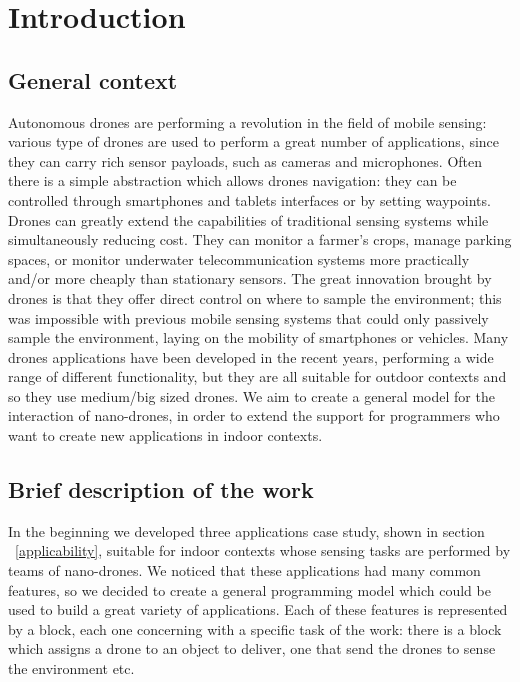 \chapter{Introduction}
\label{cap1}


\section{General context}

Autonomous drones are performing a revolution in the field of mobile sensing:
various type of drones are used to perform a great number of applications, since they can carry rich sensor payloads, such as cameras and microphones.
Often there is a simple abstraction which allows drones navigation: they can be controlled through smartphones and tablets interfaces or by setting waypoints.
Drones can greatly extend the capabilities of traditional sensing systems while simultaneously reducing cost.
They can monitor a farmer’s crops, manage parking spaces, or monitor underwater telecommunication systems more practically and/or more cheaply than stationary sensors.
The great innovation brought by drones is that they offer direct control on where to sample the environment; this was impossible with previous mobile sensing systems that could only passively sample the environment, laying on the mobility of smartphones or vehicles.
Many drones applications have been developed in the recent years, performing a wide range of different functionality, but they are all suitable for outdoor contexts and so they use medium/big sized drones.
We aim to create a general model for the interaction of nano-drones, in order to extend the support for programmers who want to create new applications in indoor contexts.


\section{Brief description of the work}

In the beginning we developed three applications case study, shown in section ~\ref{applicability}, suitable for indoor contexts whose sensing tasks are performed by teams of nano-drones.
We noticed that these applications had many common features, so we decided to create a general programming model which could be used to build a great variety of applications.
Each of these features is represented by a block, each one concerning with a specific task of the work: there is a block which assigns a drone to an object to deliver, one that send the drones to sense the environment etc.
\\

